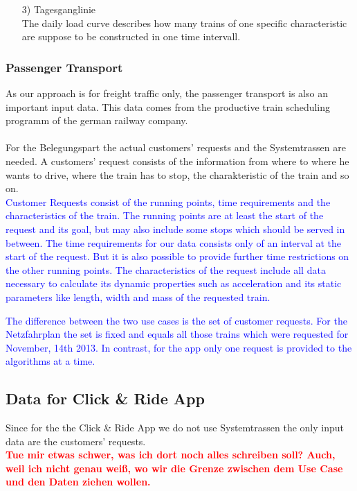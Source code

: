 \begin{itemize}
	\item[3)] Tagesganglinie \\
	The daily load curve describes how many trains of one specific characteristic are suppose to be constructed in one time intervall. 
\end{itemize}

\subsubsection{Passenger Transport}
As our approach is for freight traffic only, the passenger transport is also an important input data. This data comes from the productive train scheduling programm of the german railway company. \\ 
\\
For the Belegungspart the actual customers' requests and the Systemtrassen are needed. A customers' request consists of the information from where to where he wants to drive, where the train has to stop, the charakteristic of the train and so on.\\

\textcolor{blue}{Customer Requests consist of the running points, time requirements and the characteristics of the train. The running points are at least the start of the request and its goal, but may also include some stops which should be served in between. The time requirements for our data consists only of an interval at the start of the request. But it is also possible to provide further time restrictions on the other running points. The characteristics of the request include all data necessary to calculate its dynamic properties such as acceleration and its static parameters like length, width and mass of the requested train.}

\textcolor{blue}{The difference between the two use cases is the set of customer requests. For the Netzfahrplan the set is fixed and equals all those trains which were requested for November, 14th 2013. In contrast, for the app only one request is provided to the algorithms at a time.}


\subsection{Data for Click \& Ride App}
\label{chap:dataCnR}
Since for the the Click \& Ride App we do not use Systemtrassen the only input data are the customers' requests. 
\\
\textbf{\textcolor{red}{Tue mir etwas schwer, was ich dort noch alles schreiben soll? Auch, weil ich nicht genau weiß, wo wir die Grenze zwischen dem Use Case und den Daten ziehen wollen.}}
